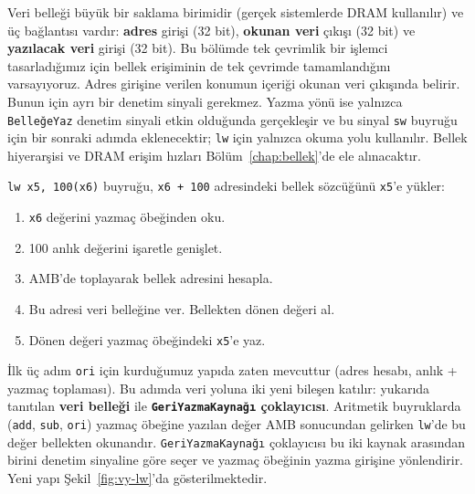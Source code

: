 Veri belleği büyük bir saklama birimidir (gerçek sistemlerde DRAM kullanılır) ve üç bağlantısı vardır: \textbf{adres} girişi (32 bit), \textbf{okunan veri} çıkışı (32 bit) ve \textbf{yazılacak veri} girişi (32 bit). Bu bölümde tek çevrimlik bir işlemci tasarladığımız için bellek erişiminin de tek çevrimde tamamlandığını varsayıyoruz. Adres girişine verilen konumun içeriği okunan veri çıkışında belirir. Bunun için ayrı bir denetim sinyali gerekmez. Yazma yönü ise yalnızca \texttt{BelleğeYaz} denetim sinyali etkin olduğunda gerçekleşir ve bu sinyal \texttt{sw} buyruğu için bir sonraki adımda eklenecektir; \texttt{lw} için yalnızca okuma yolu kullanılır. Bellek hiyerarşisi ve DRAM erişim hızları Bölüm~\ref{chap:bellek}'de ele alınacaktır.

\texttt{lw x5, 100(x6)} buyruğu, \texttt{x6 + 100} adresindeki bellek sözcüğünü \texttt{x5}'e yükler:
\begin{enumerate}
    \item \texttt{x6} değerini yazmaç öbeğinden oku.
    \item 100 anlık değerini işaretle genişlet.
    \item AMB'de toplayarak bellek adresini hesapla.
    \item Bu adresi veri belleğine ver. Bellekten dönen değeri al.
    \item Dönen değeri yazmaç öbeğindeki \texttt{x5}'e yaz.
\end{enumerate}

İlk üç adım \texttt{ori} için kurduğumuz yapıda zaten mevcuttur (adres hesabı, anlık + yazmaç toplaması). Bu adımda veri yoluna iki yeni bileşen katılır: yukarıda tanıtılan \textbf{veri belleği} ile \textbf{\texttt{GeriYazmaKaynağı} çoklayıcısı}. Aritmetik buyruklarda (\texttt{add}, \texttt{sub}, \texttt{ori}) yazmaç öbeğine yazılan değer AMB sonucundan gelirken \texttt{lw}'de bu değer bellekten okunandır. \texttt{GeriYazmaKaynağı} çoklayıcısı bu iki kaynak arasından birini denetim sinyaline göre seçer ve yazmaç öbeğinin yazma girişine yönlendirir. Yeni yapı Şekil~\ref{fig:vy-lw}'da gösterilmektedir.

